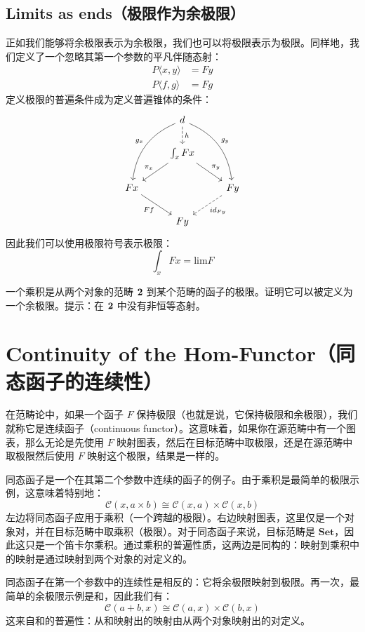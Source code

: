 \documentclass[DaoFP]{subfiles}
\begin{document}
 \subsection{Limits as ends（极限作为余极限）}
 正如我们能够将余极限表示为余极限，我们也可以将极限表示为极限。同样地，我们定义了一个忽略其第一个参数的平凡伴随态射：
 \begin{align*}
  P \langle x, y \rangle &= F y \\
  P \langle f, g \rangle &= F g
 \end{align*}
 定义极限的普遍条件成为定义普遍锥体的条件：
 \[
  \begin{tikzcd}
   &d
   \arrow[ddl, bend right, "g_x"']
   \arrow[ddr, bend left, "g_y"]
   \arrow[d, dashed, "h"]
   \\
   & \int_x F x
   \arrow[ld, "\pi_x"']
   \arrow[rd, "\pi_y"]
   \\
   F x
   \arrow[dr, "F f"']
   &&F y
   \arrow[dl, dashed, "id_{F y}"]
   \\
   & F y
  \end{tikzcd}
 \]
 因此我们可以使用极限符号表示极限：
 \[ \int_x F x = \text{lim} F \]

 \begin{exercise}
  一个乘积是从两个对象的范畴 $\mathbf{2}$ 到某个范畴的函子的极限。证明它可以被定义为一个余极限。提示：在 $\mathbf{2}$ 中没有非恒等态射。
 \end{exercise}

 \section{Continuity of the Hom-Functor（同态函子的连续性）}

 在范畴论中，如果一个函子 $F$ 保持极限（也就是说，它保持极限和余极限），我们就称它是连续函子（continuous functor）。这意味着，如果你在源范畴中有一个图表，那么无论是先使用 $F$ 映射图表，然后在目标范畴中取极限，还是在源范畴中取极限然后使用 $F$ 映射这个极限，结果是一样的。

 同态函子是一个在其第二个参数中连续的函子的例子。由于乘积是最简单的极限示例，这意味着特别地：
 \[ \mathcal{C}(x, a \times b) \cong \mathcal{C}(x, a) \times \mathcal{C}(x, b) \]
 左边将同态函子应用于乘积（一个跨越的极限）。右边映射图表，这里仅是一个对象对，并在目标范畴中取乘积（极限）。对于同态函子来说，目标范畴是 $\mathbf{Set}$，因此这只是一个笛卡尔乘积。通过乘积的普遍性质，这两边是同构的：映射到乘积中的映射是通过映射到两个对象的对定义的。

 同态函子在第一个参数中的连续性是相反的：它将余极限映射到极限。再一次，最简单的余极限示例是和，因此我们有：
 \[ \mathcal{C}(a + b, x) \cong \mathcal{C}(a, x) \times \mathcal{C}(b, x) \]
 这来自和的普遍性：从和映射出的映射由从两个对象映射出的对定义。
\end{document}
